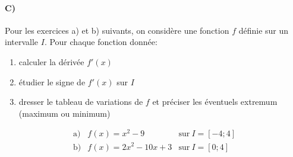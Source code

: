\documentclass[a4paper]{article}
\begin{document}
  \paragraph{C)}
  Pour les exercices a) et b) suivants, on considère une fonction $f$ définie sur un intervalle $I$. Pour chaque fonction donnée:
  \begin{enumerate}
    \item calculer la dérivée $f'(x)$
    \item étudier le signe de $f'(x)$ sur $I$
    \item dresser le tableau de variations de $f$ et préciser les éventuels extremum (maximum ou minimum)
  \end{enumerate}
  \vspace{0.5cm}
  \[
    \begin{array}{llll}
      \mathrm{a)} & f(x) = x^2 - 9 & \mathrm{sur}\ I = [-4; 4]\\[0.5cm]
      \mathrm{b)} & f(x) = 2x^2 - 10x + 3 & \mathrm{sur}\ I = [0; 4]
    \end{array}
  \]
\end{document}
